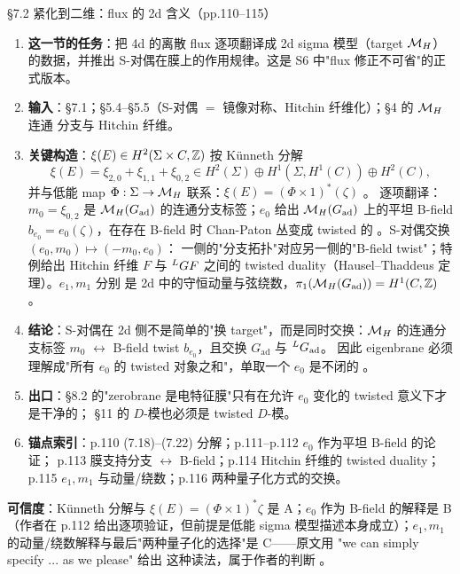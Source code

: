 \begin{kcard}{\S7.2 紧化到二维：flux 的 2d 含义（pp.110--115）}
\begin{enumerate}[label=\textbf{\arabic*}]
\item \textbf{这一节的任务}：把 4d 的离散 flux 逐项翻译成 2d sigma 模型（target $\mathcal{M}_H$）的数据，并推出
  S-对偶在膜上的作用规律。这是 S6 中"flux 修正不可省"的正式版本。
\item \textbf{输入}：\S7.1；\S5.4--\S5.5（S-对偶 $=$ 镜像对称、Hitchin 纤维化）；\S4 的 $\mathcal{M}_H$ 连通
  分支与 Hitchin 纤维。
\item \textbf{关键构造}：$\xi(E)\in H^2(\Sigma\times C,\mathbb{Z})$ 按 Künneth 分解
\begin{equation}
\xi(E)=\xi_{2,0}+\xi_{1,1}+\xi_{0,2}\in H^2(\Sigma)\oplus H^1(\Sigma,H^1(C))\oplus H^2(C),
\label{eq:geom-kunneth}
\end{equation}
  并与低能 map $\Phi:\Sigma\to\mathcal{M}_H$ 联系：$\xi(E)=(\Phi\times1)^*(\zeta)$ \pA{}。
  逐项翻译：$m_0=\xi_{0,2}$ 是 $\mathcal{M}_H(G_{\mathrm{ad}})$ 的连通分支标签；$e_0$ 给出
  $\mathcal{M}_H(G_{\mathrm{ad}})$ 上的平坦 B-field $b_{e_0}=e_0(\zeta)$，在存在 B-field 时 Chan-Paton 丛变成
  twisted 的 \pA{}。S-对偶交换 $(e_0,m_0)\mapsto(-m_0,e_0)$：
  一侧的"分支拓扑"对应另一侧的"B-field twist"；特例给出 Hitchin 纤维 $F$ 与 ${}^{L}G F$ 之间的
  twisted duality（Hausel--Thaddeus 定理）\pA{}。$e_1,m_1$ 分别
  是 2d 中的守恒动量与弦绕数，$\pi_1(\mathcal{M}_H(G_{\mathrm{ad}}))=H^1(C,\mathbb{Z})$ \pA{}。
\item \textbf{结论}：S-对偶在 2d 侧不是简单的"换 target"，而是同时交换：$\mathcal{M}_H$ 的连通分支标签 $m_0$
  $\leftrightarrow$ B-field twist $b_{e_0}$，且交换 $G_{\mathrm{ad}}$ 与 ${}^{L}G_{\mathrm{ad}}$。
  因此 eigenbrane 必须理解成"所有 $e_0$ 的 twisted 对象之和"，单取一个 $e_0$ 是不闭的
  \pA{}。
\item \textbf{出口}：\S8.2 的"zerobrane 是电特征膜"只有在允许 $e_0$ 变化的 twisted 意义下才是干净的；
  \S11 的 $D$-模也必须是 twisted $D$-模。
\item \textbf{锚点索引}：p.110 (7.18)--(7.22) 分解；p.111--p.112 $e_0$ 作为平坦 B-field 的论证；
  p.113 膜支持分支 $\leftrightarrow$ B-field；p.114 Hitchin 纤维的 twisted duality；p.115 $e_1,m_1$
  与动量/绕数；p.116 两种量子化方式的交换。
\end{enumerate}
\textbf{可信度}：Künneth 分解与 $\xi(E)=(\Phi\times1)^*\zeta$ 是 A；$e_0$ 作为 B-field 的解释是 B
（作者在 p.112 给出逐项验证，但前提是低能 sigma 模型描述本身成立）\pB{}；$e_1,m_1$
的动量/绕数解释与最后"两种量子化的选择"是 C——原文用 "we can simply specify ... as we please" 给出
这种读法，属于作者的判断 \pC{}。
\end{kcard}

